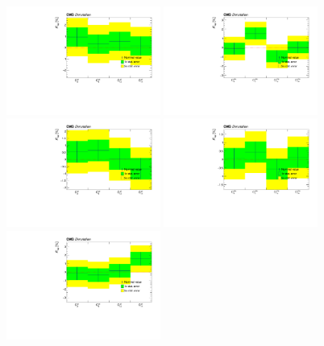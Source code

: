 \begin{figure}
    \centering
    \includegraphics[width=0.45\textwidth]{figure/SimAcp_16_el_background_chi2_20_opt_150.pdf}
    \includegraphics[width=0.45\textwidth]{figure/SimAcp_16_mu_background_chi2_20_opt_150.pdf}
    \includegraphics[width=0.45\textwidth]{figure/SimAcp_17_el_background_chi2_20_opt_150.pdf}
    \includegraphics[width=0.45\textwidth]{figure/SimAcp_17_mu_background_chi2_20_opt_150.pdf}
    \includegraphics[width=0.45\textwidth]{figure/SimAcp_18_el_background_chi2_20_opt_150.pdf}

\end{figure}

